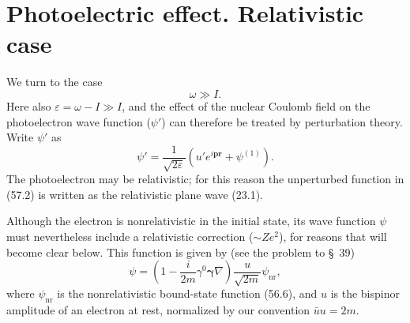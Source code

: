 \section{Photoelectric effect. Relativistic case}

We turn to the case
\begin{equation}
\omega\gg I.
\tag{57.1}
\end{equation}
Here also $\varepsilon=\omega-I\gg I$, and the effect of the nuclear Coulomb field on the photoelectron wave function ($\psi'$) can therefore be treated by perturbation theory. Write $\psi'$ as
\begin{equation}
\psi'=\frac1{\sqrt{2\varepsilon}}
\left(u'e^{i\mathbf p\mathbf r}+\psi^{(1)}\right).
\tag{57.2}
\end{equation}
The photoelectron may be relativistic; for this reason the unperturbed function in (57.2) is written as the relativistic plane wave (23.1).

Although the electron is nonrelativistic in the initial state, its wave function $\psi$ must nevertheless include a relativistic correction ($\sim Ze^2$), for reasons that will become clear below. This function is given by (see the problem to \S~39)
\begin{equation}
\psi=\left(1-\frac i{2m}\gamma^0\boldsymbol\gamma\nabla\right)
\frac u{\sqrt{2m}}\psi_{\text{nr}},
\tag{57.3}
\end{equation}
where $\psi_{\text{nr}}$ is the nonrelativistic bound-state function (56.6), and $u$ is the bispinor amplitude of an electron at rest, normalized by our convention $\bar uu=2m$.

